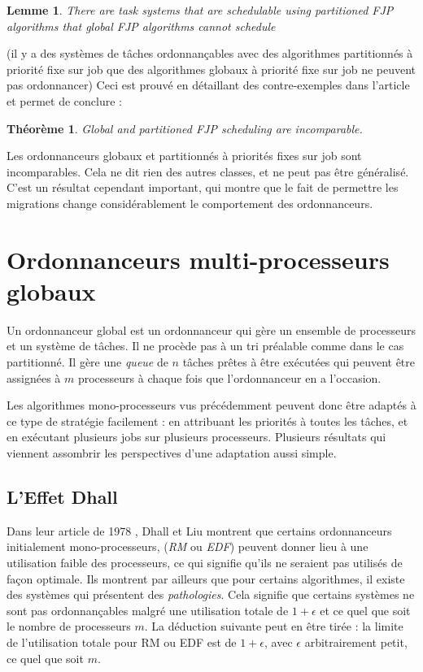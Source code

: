 \documentclass[11pt,a4paper,oneside]{report}
\newtheorem{mytheorem}{Théorème}
\newtheorem{mylemme}{Lemme}
\begin{document}
	\begin{mylemme}
		There are task systems that are schedulable using partitioned FJP algorithms that global FJP algorithms cannot schedule
	\end{mylemme}
	(il y a des systèmes de tâches ordonnançables avec des algorithmes partitionnés à priorité fixe 
	sur job que des algorithmes globaux à priorité fixe sur job ne peuvent pas ordonnancer)\medskip
	Ceci est prouvé en détaillant des contre-exemples dans l'article et permet de conclure :\medskip
	\begin{mytheorem}
		Global and partitioned FJP scheduling are incomparable.
	\end{mytheorem}
	Les ordonnanceurs globaux et partitionnés à priorités fixes sur job sont incomparables. 
	Cela ne dit rien des autres classes, et ne peut pas être généralisé. C'est 
	un résultat cependant important, qui montre que le fait de permettre les migrations 
	change considérablement le comportement des ordonnanceurs.
	
	\section{Ordonnanceurs multi-processeurs globaux}
	Un ordonnanceur global est un ordonnanceur qui gère un ensemble de processeurs et 
	un système de tâches. Il ne procède pas à un tri préalable comme dans le cas partitionné. 
	Il gère une \textit{queue} de $n$ tâches prêtes à être exécutées 
	qui peuvent être assignées à $m$ processeurs à chaque fois que l'ordonnanceur en a l'occasion.\medskip
	
	Les algorithmes mono-processeurs vus précédemment peuvent donc être adaptés 
	à ce type de stratégie facilement : en attribuant les priorités à toutes les tâches, et en 
	exécutant plusieurs jobs sur plusieurs processeurs. 
	Plusieurs résultats qui viennent assombrir les perspectives d'une adaptation aussi simple. \medskip
	
	\subsection{L'Effet Dhall}
	Dans leur article de 1978 \cite{dhall_real-time_1978}, Dhall et Liu montrent que certains ordonnanceurs 
	initialement mono-processeurs, (\textit{RM} ou \textit{EDF}) peuvent donner lieu à une utilisation faible des 
	processeurs, ce qui signifie qu'ils ne seraient pas utilisés de façon optimale. 
	Ils montrent par ailleurs que pour certains algorithmes, 
	il existe des systèmes qui présentent des \textit{pathologies}.
	Cela signifie que certains systèmes ne sont pas ordonnançables malgré une 
	utilisation totale de $1 + \epsilon$ et ce quel que soit le nombre de processeurs $m$.
	La déduction suivante peut en être tirée : la limite de l'utilisation totale 
	pour RM ou EDF est de $1 + \epsilon$, avec $\epsilon$ arbitrairement petit, ce 
	quel que soit $m$.
	
\end{document}
